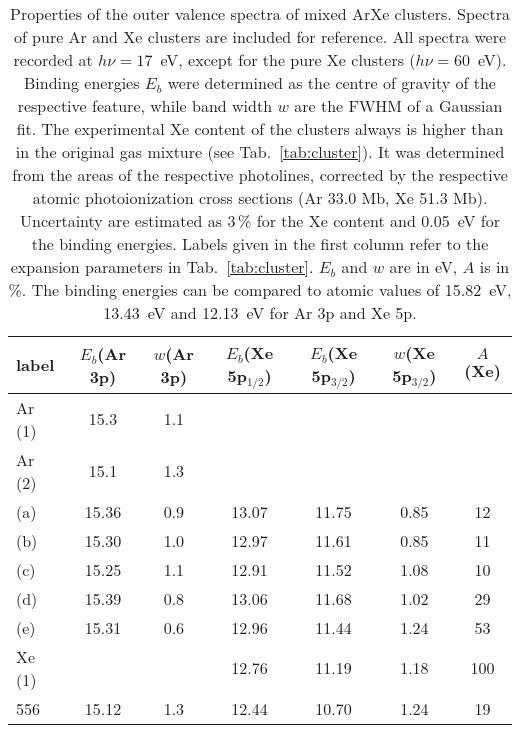 \begin{table}
\caption{Properties of the outer valence spectra of mixed ArXe clusters. Spectra of pure Ar and Xe clusters are included for reference. All spectra were recorded at $h\nu = 17$~eV, except for the pure Xe clusters ($h\nu = 60$~eV). Binding energies $E_b$ were determined as the centre of gravity of the respective feature, while band width $w$ are the FWHM of a Gaussian fit. The experimental Xe content of the clusters always is higher than in the original gas mixture (see Tab.\ \protect\ref{tab:cluster}). It was determined from the areas of the respective photolines, corrected by the respective atomic photoionization cross sections (Ar 33.0 Mb, Xe 51.3 Mb)\cite{samson2002}. Uncertainty are estimated as 3\,\% for the Xe content and 0.05~eV for the binding energies. Labels given in the first column refer to the expansion parameters in Tab.\ \protect\ref{tab:cluster}. $E_b$ and $w$ are in eV, $A$ is in \%. The binding energies can be compared to atomic values of 15.82~eV, 13.43~eV and 12.13~eV for Ar 3p and Xe 5p.
\label{tab:valence} }
\begin{tabular}{ l c c c c c c}
%
\toprule
  label & $E_b$(Ar 3p) & $w$(Ar 3p) & $E_b$(Xe 5p$_{1/2}$) &  $E_b$(Xe 5p$_{3/2}$) & $w$(Xe 5p$_{3/2}$)  &  $A$(Xe) \\
%
\midrule
 Ar (1) &  15.3  &  1.1 & & & &  \\
 Ar (2) &  15.1  &  1.3 & & & &  \\
%
 (a) & 15.36 & 0.9 & 13.07 & 11.75 & 0.85 & 12\\
 (b) & 15.30 & 1.0 & 12.97 & 11.61 & 0.85 & 11\\
 (c) & 15.25 & 1.1 & 12.91 & 11.52 & 1.08 & 10\\
 (d) & 15.39 & 0.8 & 13.06 & 11.68 & 1.02 & 29\\
 (e) & 15.31 & 0.6 & 12.96 & 11.44 & 1.24 & 53\\
Xe (1) & & & 12.76 & 11.19 & 1.18 & 100\\
%
\midrule
%
 556 & 15.12 & 1.3 & 12.44 & 10.70 & 1.24 & 19\\
\bottomrule
\end{tabular}
\end{table}

